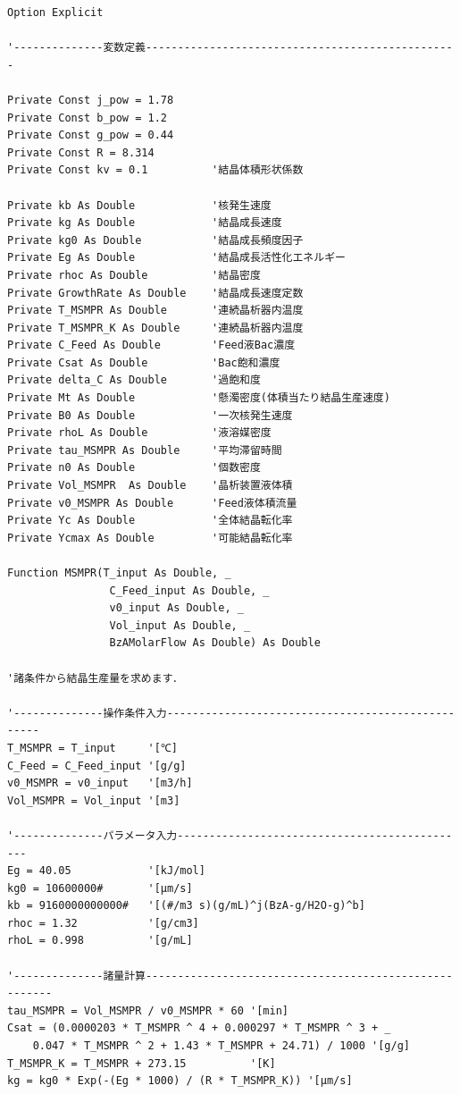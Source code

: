 \documentclass[a4j]{jsreport}
\begin{document}
\begin{lstlisting}[caption=晶析器]
Option Explicit

'--------------変数定義-------------------------------------------------

Private Const j_pow = 1.78
Private Const b_pow = 1.2
Private Const g_pow = 0.44
Private Const R = 8.314
Private Const kv = 0.1          '結晶体積形状係数

Private kb As Double            '核発生速度
Private kg As Double            '結晶成長速度
Private kg0 As Double           '結晶成長頻度因子
Private Eg As Double            '結晶成長活性化エネルギー
Private rhoc As Double          '結晶密度
Private GrowthRate As Double    '結晶成長速度定数
Private T_MSMPR As Double       '連続晶析器内温度
Private T_MSMPR_K As Double     '連続晶析器内温度
Private C_Feed As Double        'Feed液Bac濃度
Private Csat As Double          'Bac飽和濃度
Private delta_C As Double       '過飽和度
Private Mt As Double            '懸濁密度(体積当たり結晶生産速度)
Private B0 As Double            '一次核発生速度
Private rhoL As Double          '液溶媒密度
Private tau_MSMPR As Double     '平均滞留時間
Private n0 As Double            '個数密度
Private Vol_MSMPR  As Double    '晶析装置液体積
Private v0_MSMPR As Double      'Feed液体積流量
Private Yc As Double            '全体結晶転化率
Private Ycmax As Double         '可能結晶転化率

Function MSMPR(T_input As Double, _
                C_Feed_input As Double, _
                v0_input As Double, _
                Vol_input As Double, _
                BzAMolarFlow As Double) As Double

'諸条件から結晶生産量を求めます．

'--------------操作条件入力--------------------------------------------------
T_MSMPR = T_input     '[℃]
C_Feed = C_Feed_input '[g/g]
v0_MSMPR = v0_input   '[m3/h]
Vol_MSMPR = Vol_input '[m3]

'--------------パラメータ入力----------------------------------------------
Eg = 40.05            '[kJ/mol]
kg0 = 10600000#       '[μm/s]
kb = 9160000000000#   '[(#/m3 s)(g/mL)^j(BzA-g/H2O-g)^b]
rhoc = 1.32           '[g/cm3]
rhoL = 0.998          '[g/mL]

'--------------諸量計算-------------------------------------------------------
tau_MSMPR = Vol_MSMPR / v0_MSMPR * 60 '[min]
Csat = (0.0000203 * T_MSMPR ^ 4 + 0.000297 * T_MSMPR ^ 3 + _
    0.047 * T_MSMPR ^ 2 + 1.43 * T_MSMPR + 24.71) / 1000 '[g/g]
T_MSMPR_K = T_MSMPR + 273.15          '[K]
kg = kg0 * Exp(-(Eg * 1000) / (R * T_MSMPR_K)) '[μm/s]



\end{lstlisting}
\end{document}
